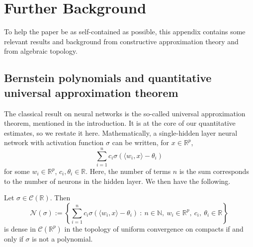 \documentclass[anon,12pt]{colt2021} %
\begin{document}

% 


\newpage


\appendix
\section{Further Background}\label{s_appendix_background}
To help the paper be as self-contained as possible, this appendix contains some relevant results and background from constructive approximation theory and from algebraic topology.  
\subsection{Bernstein polynomials and quantitative universal approximation theorem}\label{ss_Bernstein}

The classical result on neural networks is the so-called universal approximation theorem, mentioned in the introduction. It is at the core of our quantitative estimates, so we restate it here. Mathematically, a single-hidden layer neural network with activation function $\sigma$ can be written, for $x \in \mathbb{R}^{p}$,
\begin{equation} \label{NNasSum}
    \sum_{i=1}^{n} c_{i} \sigma( \langle w_{i}, x \rangle - \theta_{i})
\end{equation}
for some $w_{i} \in \mathbb{R}^{p}$, $c_{i}, \theta_{i} \in \mathbb{R}$. Here, the number of terms $n$ is the sum corresponds to the number of neurons in the hidden layer. We then have the following.

\begin{theorem}\citep[Theorem 3.1]{PinkusMLP} \label{uniapprox_main}
Let $\sigma \in \mathcal{C}(\mathbb{R})$. Then 
\begin{equation*}
    \mathcal{N}(\sigma) := \left \lbrace \sum_{i=1}^{n} c_{i} \sigma( \langle w_{i}, x \rangle - \theta_{i}) \ : \ n \in \mathbb{N}, \ w_{i} \in \mathbb{R}^{p},  \ c_{i}, \ \theta_{i} \in \mathbb{R} \right \rbrace
\end{equation*}
is dense in $\mathcal{C}(\mathbb{R}^{p})$ in the topology of uniform convergence on compacts if and only if $\sigma$ is not a polynomial.
\end{theorem}
\end{document}
